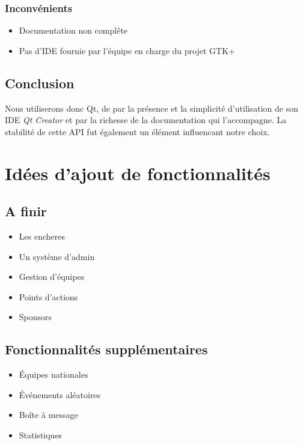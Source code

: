 \documentclass[a4paper]{report}
\begin{document}
\subsection{Inconvénients}
\begin{itemize}
    \item Documentation non complête
    \item Pas d'IDE fournie par l'équipe en charge du projet GTK+
\end{itemize}
\section{Conclusion}
Nous utiliserons donc Qt, de par la présence et la simplicité d'utilisation de son IDE \textit{Qt Creator} et par la richesse de la documentation qui l'accompagne. La stabilité de cette API fut également un élément influencant notre choix.

\chapter{Idées d'ajout de fonctionnalités}
\section{A finir}
\begin{itemize}
    \item Les \glspl{enchere}
    \item Un système d'admin
    \item Gestion d'équipes
    \item Points d'actions
    \item Sponsors
\end{itemize}
\section {Fonctionnalités supplémentaires}
\begin{itemize}
    \item Équipes nationales
    \item Événements aléatoires
    \item Boîte à message
    \item Statistiques
\end{itemize}



\printindex
\listoffigures
\end{document}
